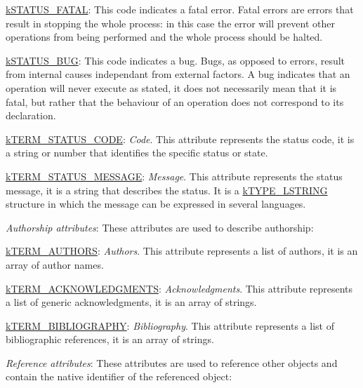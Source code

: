 \begin{DoxyItemize}
\begin{DoxyItemize}
\begin{DoxyItemize}
\item {\ttfamily \hyperlink{}{k\-S\-T\-A\-T\-U\-S\-\_\-\-F\-A\-T\-A\-L}}\-: This code indicates a fatal error. Fatal errors are errors that result in stopping the whole process\-: in this case the error will prevent other operations from being performed and the whole process should be halted. 
\item {\ttfamily \hyperlink{}{k\-S\-T\-A\-T\-U\-S\-\_\-\-B\-U\-G}}\-: This code indicates a bug. Bugs, as opposed to errors, result from internal causes independant from external factors. A bug indicates that an operation will never execute as stated, it does not necessarily mean that it is fatal, but rather that the behaviour of an operation does not correspond to its declaration. 
\end{DoxyItemize}
\item {\ttfamily \hyperlink{}{k\-T\-E\-R\-M\-\_\-\-S\-T\-A\-T\-U\-S\-\_\-\-C\-O\-D\-E}}\-: {\itshape Code}. This attribute represents the status code, it is a string or number that identifies the specific status or state. 
\item {\ttfamily \hyperlink{}{k\-T\-E\-R\-M\-\_\-\-S\-T\-A\-T\-U\-S\-\_\-\-M\-E\-S\-S\-A\-G\-E}}\-: {\itshape Message}. This attribute represents the status message, it is a string that describes the status. It is a \hyperlink{}{k\-T\-Y\-P\-E\-\_\-\-L\-S\-T\-R\-I\-N\-G} structure in which the message can be expressed in several languages. 
\end{DoxyItemize}
\item {\itshape Authorship attributes}\-: These attributes are used to describe authorship\-: 
\begin{DoxyItemize}
\item {\ttfamily \hyperlink{}{k\-T\-E\-R\-M\-\_\-\-A\-U\-T\-H\-O\-R\-S}}\-: {\itshape Authors}. This attribute represents a list of authors, it is an array of author names. 
\item {\ttfamily \hyperlink{}{k\-T\-E\-R\-M\-\_\-\-A\-C\-K\-N\-O\-W\-L\-E\-D\-G\-M\-E\-N\-T\-S}}\-: {\itshape Acknowledgments}. This attribute represents a list of generic acknowledgments, it is an array of strings. 
\item {\ttfamily \hyperlink{}{k\-T\-E\-R\-M\-\_\-\-B\-I\-B\-L\-I\-O\-G\-R\-A\-P\-H\-Y}}\-: {\itshape Bibliography}. This attribute represents a list of bibliographic references, it is an array of strings. 
\end{DoxyItemize}
\item {\itshape Reference attributes}\-: These attributes are used to reference other objects and contain the native identifier of the referenced object\-: 

\end{DoxyItemize}
